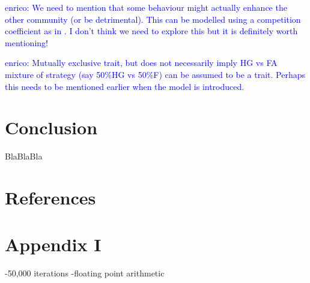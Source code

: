 \documentclass[preprint,authoryear]{elsarticle}
\newcommand{\memo}[2]{\textcolor{#1}{#2}}
\newcommand{\enrico}[1]{\memo{blue}{enrico: #1\\}}
\begin{document}
\enrico{We need to mention that some behaviour might actually enhance the other community (or be detrimental). This can be modelled using a competition coefficient as in \citep{jang2013}. I don't think we need to explore this but it is definitely worth mentioning!}

\enrico{Mutually exclusive trait, but does not necessarily imply HG vs FA mixture of strategy (say 50\%HG vs 50\%F) can be assumed to be a trait. Perhaps this needs to be mentioned earlier when the model is introduced.}

\section{Conclusion}

BlaBlaBla

\section{References}




\section{Appendix I}

-50,000 iterations
-floating point arithmetic
\end{document}
